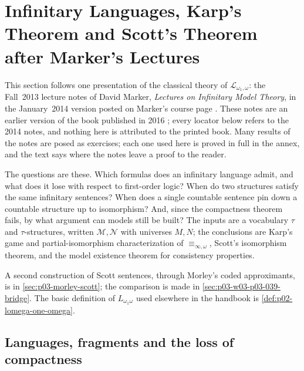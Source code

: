 \section{Infinitary Languages, Karp's Theorem and Scott's Theorem after Marker's Lectures}
\label{sec:p03-w03-p03-039-marker}

This section follows one presentation of the classical theory of
\(\mathcal L_{\omega_1,\omega}\): the Fall~2013 lecture notes of David Marker,
\emph{Lectures on Infinitary Model Theory}, in the January~2014 version
posted on Marker's course page \cite{Marker2014InfinitaryNotes}. These
notes are an earlier version of the book published in 2016
\cite{Marker2016Infinitary}; every locator below refers to the 2014 notes,
and nothing here is attributed to the printed book. Many results of the
notes are posed as exercises; each one used here is proved in full in the
annex, and the text says where the notes leave a proof to the reader.

The questions are these. Which formulas does an infinitary language admit,
and what does it lose with respect to first-order logic? When do two
structures satisfy the same infinitary sentences? When does a single
countable sentence pin down a countable structure up to isomorphism? And,
since the compactness theorem fails, by what argument can models still be
built? The inputs are a vocabulary \(\tau\) and \(\tau\)-structures, written
\(\mathcal M,\mathcal N\) with universes \(M,N\); the conclusions are
Karp's game and partial-isomorphism characterization of
\(\equiv_{\infty,\omega}\), Scott's isomorphism theorem, and the model
existence theorem for consistency properties.

A second construction of Scott sentences, through Morley's coded
approximants, is in \cref{sec:p03-morley-scott}; the comparison is made in
\cref{sec:p03-w03-p03-039-bridge}. The basic definition of
\(L_{\omega_1\omega}\) used elsewhere in the handbook is
\cref{def:p02-lomega-one-omega}.

\subsection{Languages, fragments and the loss of compactness}
\label{sec:p03-w03-p03-039-languages}

